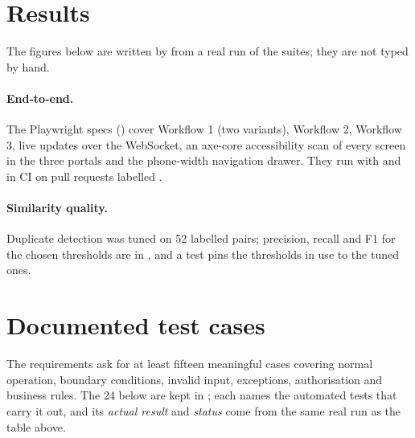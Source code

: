 \section{Results}
The figures below are written by  from a real run of the suites; they
are not typed by hand.



\paragraph{End-to-end.} The Playwright specs () cover Workflow 1 (two
variants), Workflow 2, Workflow 3, live updates over the WebSocket, an axe-core accessibility
scan of every screen in the three portals and the phone-width navigation drawer. They run with
 and in CI on pull requests labelled .

\paragraph{Similarity quality.} Duplicate detection was tuned on 52 labelled pairs; precision,
recall and F1 for the chosen thresholds are in , and a test
pins the thresholds in use to the tuned ones.

\section{Documented test cases}
The requirements ask for at least fifteen meaningful cases covering normal operation, boundary
conditions, invalid input, exceptions, authorisation and business rules. The 24 below are
kept in ; each names the automated tests that carry it out, and
its \emph{actual result} and \emph{status} come from the same real run as the table above.




